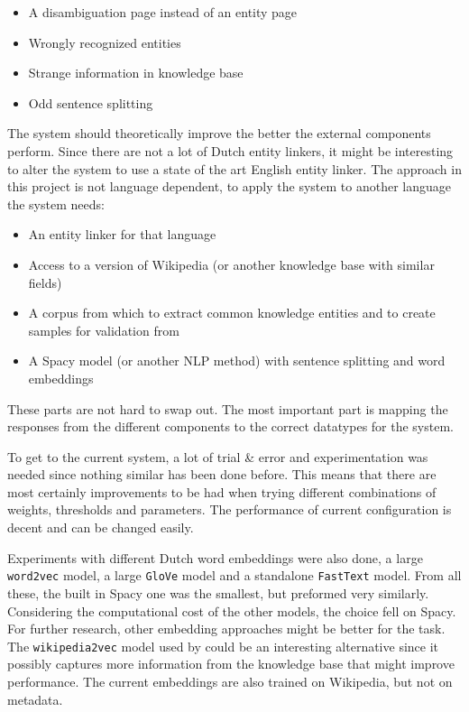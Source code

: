 \documentclass[
10pt, %
a4paper, %
oneside, %
headinclude,footinclude, %
] {book}%
\begin{document}
\begin{multicols}{2}
  \begin{itemize}
    \item A disambiguation page instead of an entity page
    \item Wrongly recognized entities
    \item Strange information in knowledge base 
    \item Odd sentence splitting
  \end{itemize}
\end{multicols}

The system should theoretically improve the better the external components perform.
Since there are not a lot of Dutch entity linkers, it might be interesting to alter the system to use a state of the art English entity linker.
The approach in this project is not language dependent, to apply the system to another language the system needs:

\begin{multicols}{2}
  \begin{itemize}
    \item An entity linker for that language
    \item Access to a version of Wikipedia (or another knowledge base with similar fields)
    \item A corpus from which to extract common knowledge entities and to create samples for validation from
    \item A Spacy model (or another NLP method) with sentence splitting and word embeddings
  \end{itemize}
\end{multicols}

These parts are not hard to swap out.
The most important part is mapping the responses from the different components to the correct datatypes for the system.

To get to the current system, a lot of trial \& error and experimentation was needed since nothing similar has been done before.
This means that there are most certainly improvements to be had when trying different combinations of weights, thresholds and parameters.
The performance of current configuration is decent and can be changed easily.

Experiments with different Dutch word embeddings were also done, a large \verb+word2vec+ model, a large \verb+GloVe+ model and a standalone \verb+FastText+ model.
From all these, the built in Spacy one was the smallest, but preformed very similarly. 
Considering the computational cost of the other models, the choice fell on Spacy.
For further research, other embedding approaches might be better for the task.
The \verb+wikipedia2vec+ model used by \cite{vanhulst2020} could be an interesting alternative since it possibly captures more information from the knowledge base that might improve performance.
The current embeddings are also trained on Wikipedia, but not on metadata.
\end{document}
